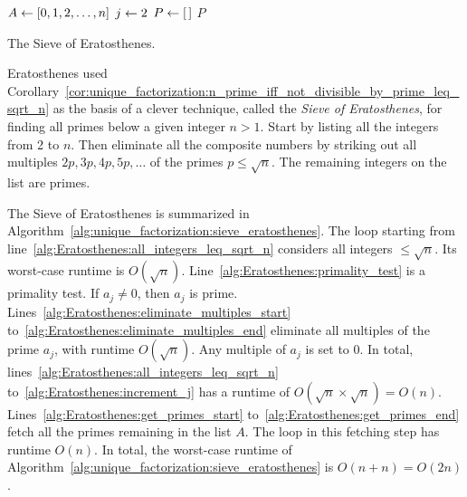 \begin{algorithm}[!htpb]
\dontprintsemicolon
\BlankLine
$A \leftarrow [0, 1, 2, \dots, n]$ \;
$j \leftarrow 2$\;
$P \leftarrow [\,]$  \;
\Return $P$ 
\caption{The Sieve of Eratosthenes.}
\label{alg:unique_factorization:sieve_eratosthenes}
\end{algorithm}

Eratosthenes used
Corollary~\ref{cor:unique_factorization:n_prime_iff_not_divisible_by_prime_leq_sqrt_n}
as the basis of a clever technique, called the
\emph{Sieve of Eratosthenes}, for finding
all primes below a given integer $n > 1$. Start by listing all the
integers from 2 to $n$. Then eliminate all the composite numbers by
striking out all multiples $2p, 3p, 4p, 5p, \dots$ of the primes
$p \leq \sqrt{n}$. The remaining integers on the list are primes.

The Sieve of Eratosthenes is summarized
in Algorithm~\ref{alg:unique_factorization:sieve_eratosthenes}. The
loop starting from line~\ref{alg:Eratosthenes:all_integers_leq_sqrt_n}
considers all integers $\leq \sqrt{n}$. Its worst-case runtime is
$O(\sqrt{n})$. Line~\ref{alg:Eratosthenes:primality_test} is a
primality test. If $a_j \neq 0$, then $a_j$ is
prime. Lines~\ref{alg:Eratosthenes:eliminate_multiples_start}
to~\ref{alg:Eratosthenes:eliminate_multiples_end} eliminate all
multiples of the prime $a_j$, with runtime $O(\sqrt{n})$. Any multiple
of $a_j$ is set to $0$. In total,
lines~\ref{alg:Eratosthenes:all_integers_leq_sqrt_n}
to~\ref{alg:Eratosthenes:increment_j} has a runtime of $O(\sqrt{n}
\times \sqrt{n}) = O(n)$. Lines~\ref{alg:Eratosthenes:get_primes_start}
to~\ref{alg:Eratosthenes:get_primes_end} fetch all the primes
remaining in the list $A$. The loop in this fetching step has runtime
$O(n)$. In total, the worst-case runtime of
Algorithm~\ref{alg:unique_factorization:sieve_eratosthenes} is
$O(n + n) = O(2n)$.

